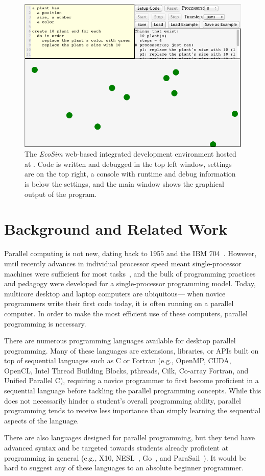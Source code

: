 \documentclass{sig-alternate}
\begin{document}
\begin{figure}
\centerline{\includegraphics[width=.49\textwidth]{figures/EcosimScreencap2.png}}
\caption{The \emph{EcoSim} web-based integrated development environment hosted at
\ecosimPath{}.  Code is written and debugged in the top left window, settings are on
the top right, a console with runtime and debug information is below the settings, and the
main window shows the graphical output of the program.}
\label{fig:ecosimScreencap}
\end{figure}


\section{Background and Related Work}
Parallel computing is not new, dating back to 1955 and the IBM 704~\cite{hockney1988parallel}.
However, until recently advances in individual processor speed meant single-processor machines
were sufficient for most tasks~\cite{amdahl1967validity}, 
and the bulk of programming practices and pedagogy were developed for a single-processor programming model.
Today, multicore desktop and laptop computers are ubiquitous---%
when novice programmers write their first code today, it is often running on a parallel computer.
In order to make the most efficient use of these computers, parallel programming is necessary.  


There are numerous programming languages available for desktop parallel programming.  Many of
these languages are extensions, libraries, or APIs built on top of sequential languages such 
as C or Fortran 
(e.g., OpenMP, CUDA, OpenCL, Intel Thread Building Blocks, pthreads, Cilk, Co-array Fortran, and Unified Parallel C),
requiring a novice programmer to first become proficient in a sequential language 
before tackling the parallel programming concepts.  
While this does not necessarily hinder a student's overall programming ability, 
parallel programming tends to receive less importance 
than simply learning the sequential aspects of the language.  

There are also languages designed for parallel programming, but they tend have advanced
syntax and be targeted towards
students already proficient at programming in general (e.g., X10\cite{X10}, 
NESL~\cite{nesl-impl-94}, Go~\cite{GoLanguage}, and ParaSail~\cite{ParaSail}).  It would be hard to suggest any of these
languages to an absolute beginner programmer.
\end{document}
